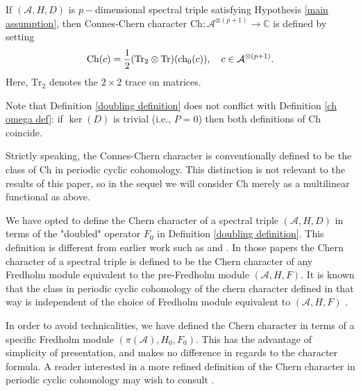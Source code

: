     
    
    
    \begin{defi}\label{chern character def}
    If $(\mathcal{A},H,D)$ is $p-$dimensional spectral triple satisfying Hypothesis \ref{main assumption}, then Connes-Chern character $\mathrm{Ch}:\mathcal{A}^{\otimes (p+1)}\to\mathbb{C}$ is defined by setting
        \begin{equation*}
            {\rm Ch}(c)=\frac12({\rm Tr_2}\otimes{\rm Tr})({\rm ch}_0(c)),\quad c\in\mathcal{A}^{\otimes (p+1)}.
        \end{equation*}
        Here, $\mathrm{Tr}_2$ denotes the $2\times 2$ trace on matrices.
    \end{defi}
    
    Note that Definition \ref{doubling definition} does not conflict with Definition \ref{ch omega def}: if $\ker(D)$ is trivial (i.e., $P=0$) then both definitions of $\mathrm{Ch}$ coincide.

    Strictly speaking, the Connes-Chern character is conventionally defined to be the class of $\mathrm{Ch}$ in periodic cyclic cohomology. This distinction is not relevant to the results of this paper, so in the sequel
    we will consider $\mathrm{Ch}$ merely as a multilinear functional as above.
   
    \begin{rem}
        We have opted to define the Chern character of a spectral triple $(\mathcal{A},H,D)$ in terms of the "doubled" operator $F_0$ in Definition \ref{doubling definition}. This definition is different
	from earlier work such as \cite[Definition 6]{CPRS1} and \cite[Definition 2.23]{CGRS2}. In those papers the Chern character of a spectral triple is defined to be the Chern character of any Fredholm module
        equivalent to the pre-Fredholm module $(\mathcal{A},H,F)$. It is known that the class in periodic cyclic cohomology of the chern character defined in that way is independent of the choice of Fredholm module equivalent to $(\mathcal{A},H,F)$ \cite[Section 5, Lemma 1]{Connes-differential-geometry}.
        
        In order to avoid technicalities, we have defined the Chern character in terms of a specific Fredholm module $(\pi(\mathcal{A}),H_0,F_0)$. This has the advantage of simplicity of presentation, and makes
        no difference in regards to the character formula. A reader interested in a more refined definition of the Chern character in periodic cyclic cohomology may wish to consult \cite{Connes-differential-geometry, CPRS1, CGRS2}.
    \end{rem}
    
